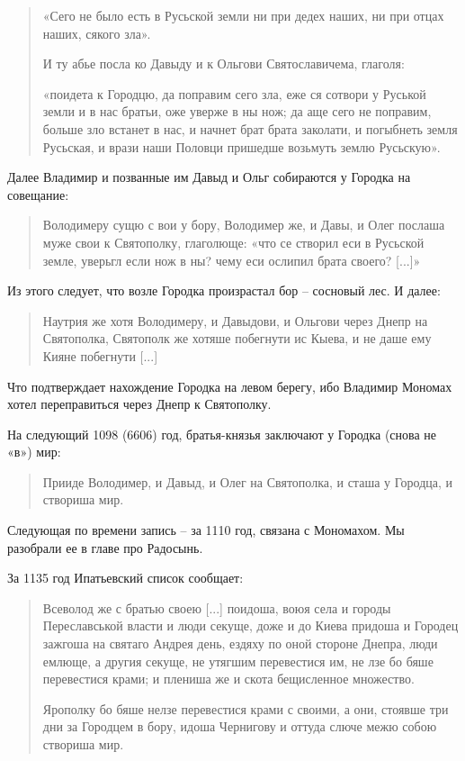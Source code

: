 \begin{quotation}
«Сего не было есть в Русьской земли ни при дедех наших, ни при отцах наших, сякого зла». 

И ту абье посла ко Давыду и к Ольгови Святославичема, глаголя: 

«поидета к Городцю, да поправим сего зла, еже ся сотвори у Руськой земли и в нас братьи, оже уверже в ны нож; да аще сего не поправим, больше зло встанет в нас, и начнет брат брата заколати, и погыбнеть земля Русьская, и врази наши Половци пришедше возьмуть землю Русьскую».
\end{quotation}

Далее Владимир и позванные им Давыд и Ольг собираются у Городка на совещание:

\begin{quotation}
Володимеру сущю с вои у бору, Володимер же, и Давы, и Олег послаша муже свои к Святополку, глаголюще: «что се створил еси в Русьской земле, уверьгл если нож в ны? чему еси ослипил брата своего? [...]»
\end{quotation}

Из этого следует, что возле Городка произрастал бор – сосновый лес. И далее:

\begin{quotation}
Наутрия же хотя Володимеру, и Давыдови, и Ольгови через Днепр на Святополка, Святополк же хотяше побегнути ис Кыева, и не даше ему Кияне побегнути [...]
\end{quotation}

Что подтверждает нахождение Городка на левом берегу, ибо Владимир Мономах хотел переправиться через Днепр к Святополку.

На следующий 1098 (6606) год, братья-князья заключают у Городка (снова не «в») мир:

\begin{quotation}
Прииде Володимер, и Давыд, и Олег на Святополка, и сташа у Городца, и створиша мир.\end{quotation}

Следующая по времени запись – за 1110 год, связана с Мономахом. Мы разобрали ее в главе про Радосынь.

За 1135 год Ипатьевский список сообщает:

\begin{quotation}
Всеволод же с братью своею [...] поидоша, воюя села и городы Переславськой власти и люди секуще, доже и до Киева придоша и Городец зажгоша на святаго Андрея день, ездяху по оной стороне Днепра, люди емлюще, а другия секуще, не утягшим перевестися им, не лзе бо бяше перевестися крами; и плениша же и скота бещисленное множество.

Ярополку бо бяше нелзе перевестися крами с своими, а они, стоявше три дни за Городцем в бору, идоша Чернигову и оттуда слюче межю собою створиша мир.
\end{quotation}

